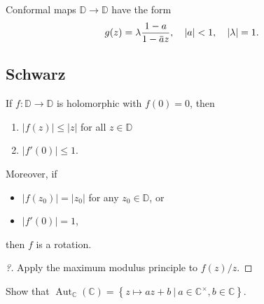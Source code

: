 \begin{theorem}

Conformal maps \({\mathbb{D}}\to{\mathbb{D}}\) have the form
\begin{align*}
g(z) = \lambda {1-a \over 1 - \mkern 1.5mu\overline{\mkern-1.5mua\mkern-1.5mu}\mkern 1.5mu z}, \quad {\left\lvert {a} \right\rvert} < 1, \quad {\left\lvert {\lambda} \right\rvert} = 1
.\end{align*}

\end{theorem}

\hypertarget{schwarz}{%
\subsection{Schwarz}\label{schwarz}}

\begin{theorem}\label{SchwarzzLemma}

If \(f: {\mathbb{D}}\to {\mathbb{D}}\) is holomorphic with \(f(0) = 0\),
then

\begin{enumerate}
\def\labelenumi{\arabic{enumi}.}
\tightlist
\item
  \({\left\lvert {f(z)} \right\rvert} \leq {\left\lvert {z} \right\rvert}\)
  for all \(z\in {\mathbb{D}}\)
\item
  \({\left\lvert {f'(0)} \right\rvert} \leq 1\).
\end{enumerate}

Moreover, if

\begin{itemize}
\tightlist
\item
  \({\left\lvert {f(z_0)} \right\rvert} = {\left\lvert {z_0} \right\rvert}\)
  for any \(z_0\in {\mathbb{D}}\), or
\item
  \({\left\lvert {f'(0)} \right\rvert} = 1\),
\end{itemize}

then \(f\) is a rotation.

\end{theorem}

\begin{proof}[?]

Apply the maximum modulus principle to \(f(z)/z\).

\end{proof}

\begin{exercise}[?]

Show that
\({\operatorname{Aut}}_{\mathbb{C}}({\mathbb{C}}) = \left\{{ z \mapsto az+b{~\mathrel{\Big|}~}a\in {\mathbb{C}}^{\times}, b\in {\mathbb{C}}}\right\}\).

\end{exercise}

